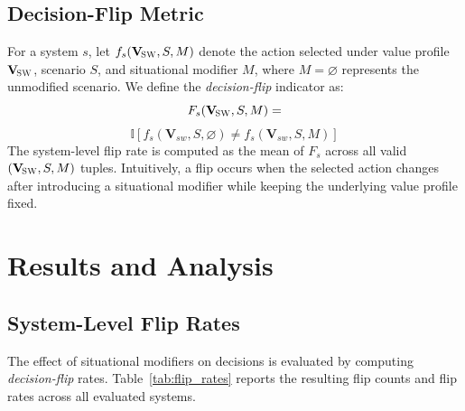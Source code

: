 \documentclass[11pt]{article}
\newcommand{\Vsw}{\mathbf{V}_{\!\textsc{SW}}}
\begin{document}
\subsection{Decision-Flip Metric}
\label{sec:flip-metric}

For a system $s$, let $f_s(\Vsw,S,M)$ denote the action selected under value profile $\Vsw$, scenario $S$, and situational modifier $M$, where $M=\varnothing$ represents the unmodified scenario. We define the \emph{decision-flip} indicator as:
\[
F_s(\Vsw,S,M) =
\]
\begin{equation}\label{eq:flip}
\mathbb{I}\!\left[
f_s(\mathbf{V}_{sw}, S, \varnothing)
\neq
f_s(\mathbf{V}_{sw}, S, M)
\right]
\end{equation}
The system-level flip rate is computed as the mean of $F_s$ across all valid $(\Vsw,S,M)$ tuples. Intuitively, a flip occurs when the selected action changes after introducing a situational modifier while keeping the underlying value profile fixed.

\section{Results and Analysis}
\label{sec:analysis}

\subsection{System-Level Flip Rates}
The effect of situational modifiers on decisions is evaluated by computing \emph{decision-flip} rates. Table~\ref{tab:flip_rates} reports the resulting flip counts and flip rates across all evaluated systems.

\end{document}
